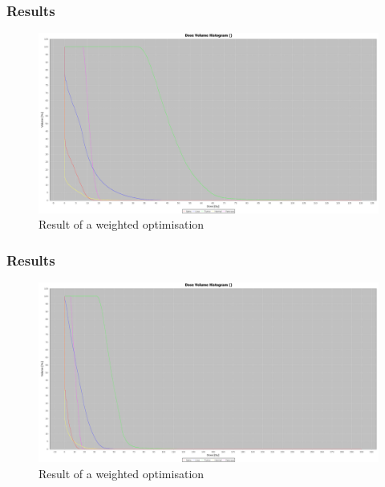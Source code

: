 \documentclass{beamer}
\begin{document}
\begin{frame}
\frametitle{Results}
	\begin{figure}[h]
	\centering
	\includegraphics[width=1\textwidth]{pictures/body1_w1-4-2-70-20.png}
	\caption{Result of a weighted optimisation}
	\end{figure}
 
 
\end{frame} 


\begin{frame}
\frametitle{Results}
	\begin{figure}[h]
	\centering
	\includegraphics[width=1\textwidth]{pictures/body2_w1-4-2-70-20.png}
	\caption{Result of a weighted optimisation}
	\end{figure}
 
 
\end{frame} 
\end{document}
